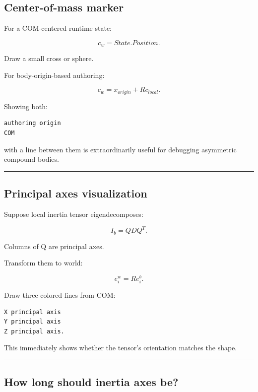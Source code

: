 \subsection{Center-of-mass marker}\label{06-engine-ii-ch039-center-of-mass-marker}

For a COM-centered runtime state:

\[
c_w=
State.Position.
\]

Draw a small cross or sphere.

For body-origin-based authoring:

\[
c_w
=
x_{origin}
+
R c_{local}.
\]

Showing both:

\begin{verbatim}
authoring origin
COM
\end{verbatim}

with a line between them is extraordinarily useful for debugging asymmetric compound bodies.

\begin{center}\rule{0.5\linewidth}{0.5pt}\end{center}

\subsection{Principal axes visualization}\label{06-engine-ii-ch039-principal-axes-visualization}

Suppose local inertia tensor eigendecomposes:

\[
I_b=QDQ^T.
\]

Columns of Q are principal axes.

Transform them to world:

\[
e_i^w=R e_i^b.
\]

Draw three colored lines from COM:

\begin{verbatim}
X principal axis
Y principal axis
Z principal axis.
\end{verbatim}

This immediately shows whether the tensor's orientation matches the shape.

\begin{center}\rule{0.5\linewidth}{0.5pt}\end{center}

\subsection{How long should inertia axes be?}\label{06-engine-ii-ch039-how-long-should-inertia-axes-be}


